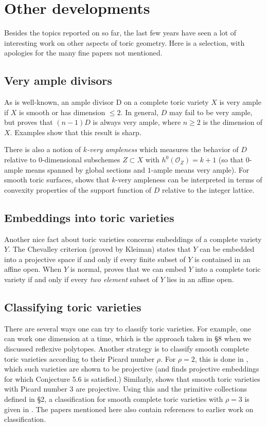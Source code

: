 \documentclass{amsart}
\theoremstyle{plain}
\theoremstyle{definition}
\begin{document}
\section{Other developments}

	Besides the topics reported on so far, the last few years have
seen a lot of interesting work on other aspects of toric geometry.
Here is a selection, with apologies for the many fine papers not
mentioned.

	\subsection{Very ample divisors} As is well-known, an
ample divisor D on a complete toric variety $X$ is very ample if $X$
is smooth or has dimension $\le 2$.  In general, $D$ may fail to be
very ample, but \cite{EW} proves that $(n-1)D$ is always very ample,
where $n \ge 2$ is the dimension of $X$.  Examples show that this
result is sharp.

	There is also a notion of {\it $k$-very ampleness\/} which
measures the behavior of $D$ relative to $0$-dimensional subschemes $Z
\subset X$ with $h^0(\mathcal{O}_Z) = k+1$ (so that $0$-ample means
spanned by global sections and $1$-ample means very ample).  For
smooth toric surfaces, \cite{DiR} shows that $k$-very ampleness can be
interpreted in terms of convexity properties of the support function
of $D$ relative to the integer lattice.

	\subsection{Embeddings into toric varieties} Another
nice fact about toric varieties concerns embeddings of a complete
variety $Y$.  The Chevalley criterion (proved by Kleiman) states that
$Y$ can be embedded into a projective space if and only if every
finite subset of $Y$ is contained in an affine open.  When $Y$ is
normal, \cite{Wlo} proves that we can embed $Y$ into a complete
toric variety if and only if every {\it two element\/} subset of $Y$
lies in an affine open.

	\subsection{Classifying toric varieties} There are
several ways one can try to classify toric varieties.  For example,
one can work one dimension at a time, which is the approach taken in
\S8 when we discussed reflexive polytopes.  Another strategy is to
classify smooth complete toric varieties according to their Picard
number $\rho$.  For $\rho = 2$, this is done in \cite{Kle}, which such
varieties are shown to be projective (and \cite{ESch} finds projective
embeddings for which Conjecture 5.6 is satisfied.)  Similarly,
\cite{KS} shows that smooth toric varieties with Picard number $3$ are
projective.  Using this and the primitive collections defined in \S2,
a classification for smooth complete toric varieties with $\rho = 3$ is
given in \cite{Bat2}.  The papers mentioned here also contain
references to earlier work on classification.
\end{document}
